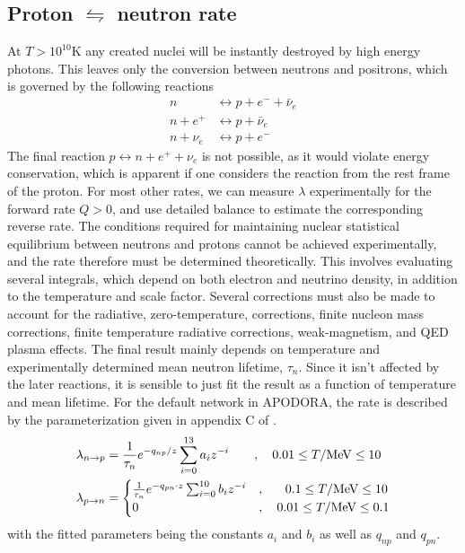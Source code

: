 \subsection[Proton to neutron rate]{Proton $\leftrightharpoons$ neutron rate}
At $T>10^{10}$K any created nuclei will be instantly destroyed by high energy photons. This leaves only the conversion between neutrons and positrons, which is governed by the following reactions
\begin{align}
    n &\leftrightarrow p+e^-+\bar{\nu}_e\\
    n+e^+ &\leftrightarrow p+\bar{\nu}_e\\
    n+\nu_e &\leftrightarrow p+e^-
\end{align}
The final reaction $p\leftrightarrow n+e^++\nu_e$ is not possible, as it would violate energy conservation, which is apparent if one considers the reaction from the rest frame of the proton. For most other rates, we can measure $\lambda$ experimentally for the forward rate $Q>0$, and use detailed balance to estimate the corresponding reverse rate. The conditions required for maintaining nuclear statistical equilibrium between neutrons and protons cannot be achieved experimentally, and the rate therefore must be determined theoretically. This involves evaluating several integrals, which depend on both electron and neutrino density, in addition to the temperature and scale factor. Several corrections must also be made to account for the radiative, zero-temperature, corrections, finite nucleon mass corrections, finite temperature radiative corrections, weak-magnetism, and QED plasma effects\cite{PRIMAT}. 
The final result mainly depends on temperature and experimentally determined mean neutron lifetime, $\tau_n$. Since it isn't affected by the later reactions, it is sensible to just fit the result as a function of temperature and mean lifetime. 
For the default network in APODORA, the rate is described by the parameterization given in appendix C of \textcite{Serpico_2004}.
\begin{align}
    \lambda_{n\rightarrow p}&=\frac{1}{\tau_n}e^{-q_{np}/z}\sum_{i=0}^{13}a_i z^{-i}\quad\quad , \quad 0.01\leq T/\text{MeV} \leq 10 \\
    \lambda_{p\rightarrow n}&=
\begin{cases}
    \frac{1}{\tau_n}e^{-q_{pn}\cdot z}\sum_{i=0}^{10}b_i z^{-i}&,\quad\ \ 0.1\leq T/\text{MeV} \leq 10\\
        0&,\quad 0.01\leq T/\text{MeV} \leq 0.1
\end{cases}
\end{align}
with the fitted parameters being the constants $a_i$ and $b_i$ as well as $q_{np}$ and $q_{pn}$. 

